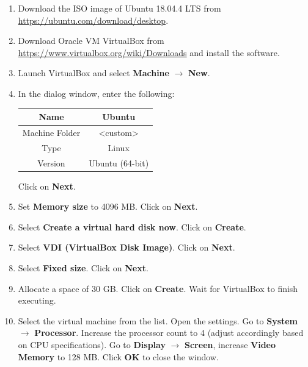 \documentclass[11pt,letterpaper,titlepage]{article}
\begin{document}
\begin{enumerate}
    
    \item Download the ISO image of Ubuntu 18.04.4 LTS from \url{https://ubuntu.com/download/desktop}.
    
    \item Download Oracle VM VirtualBox from \url{https://www.virtualbox.org/wiki/Downloads} and install the software.
    
    \item Launch VirtualBox and select \textbf{Machine} $\rightarrow$ \textbf{New}. 
    
    \item In the dialog window, enter the following:
    
    \begin{table}[ht]
    \centering
    \begin{tabular}{@{}cc@{}}
    \toprule
    Name           & Ubuntu                          \\ \midrule
    Machine Folder & \textless{}custom\textgreater{} \\ \midrule
    Type           & Linux                           \\ \midrule
    Version        & Ubuntu (64-bit)                 \\ \bottomrule
    \end{tabular}
    \end{table}
    
    Click on \textbf{Next}.
    
    \item Set \textbf{Memory size} to 4096 MB. Click on \textbf{Next}.
    
    \item Select \textbf{Create a virtual hard disk now}. Click on \textbf{Create}.
    
    \item Select \textbf{VDI (VirtualBox Disk Image)}. Click on \textbf{Next}.
    
    \item Select \textbf{Fixed size}. Click on \textbf{Next}.
    
    \item Allocate a space of 30 GB. Click on \textbf{Create}. Wait for VirtualBox to finish executing.
    
    \item Select the virtual machine from the list. Open the settings. Go to \textbf{System} $\rightarrow$ \textbf{Processor}. Increase the processor count to 4 (adjust accordingly based on CPU specifications). Go to \textbf{Display} $\rightarrow$ \textbf{Screen}, increase \textbf{Video Memory} to 128 MB. Click \textbf{OK} to close the window.
    

\end{enumerate}
\end{document}
